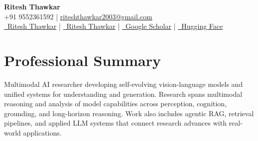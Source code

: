 \documentclass[11pt,a4paper]{article}
\begin{document}
\thispagestyle{empty}

\begin{center}
  {\Huge\bfseries Ritesh Thawkar}\\[2pt]
  +91 9552361592 \enspace | \enspace \href{mailto:riteshthawkar2003@gmail.com}{riteshthawkar2003@gmail.com}\\[3pt]
  \href{https://www.linkedin.com/in/ritesh-thawkar-b13192233/}{\faLinkedin\ Ritesh Thawkar} \enspace | \enspace \href{https://github.com/riteshthawkar}{\faGithub\ Ritesh Thawkar} \enspace | \enspace \href{https://scholar.google.com/citations?hl=en\&user=9-2AnjQAAAAJ}{\faGraduationCap\ Google Scholar} \enspace | \enspace \href{https://huggingface.co/Ritesh-hf}{\faRobot\ Hugging Face}
\end{center}
\vspace{-0.45em}

\section*{Professional Summary}
Multimodal AI researcher developing self-evolving vision-language models and unified systems for understanding and generation. Research spans multimodal reasoning and analysis of model capabilities across perception, cognition, grounding, and long-horizon reasoning. Work also includes agentic RAG, retrieval pipelines, and applied LLM systems that connect research advances with real-world applications.
\end{document}
